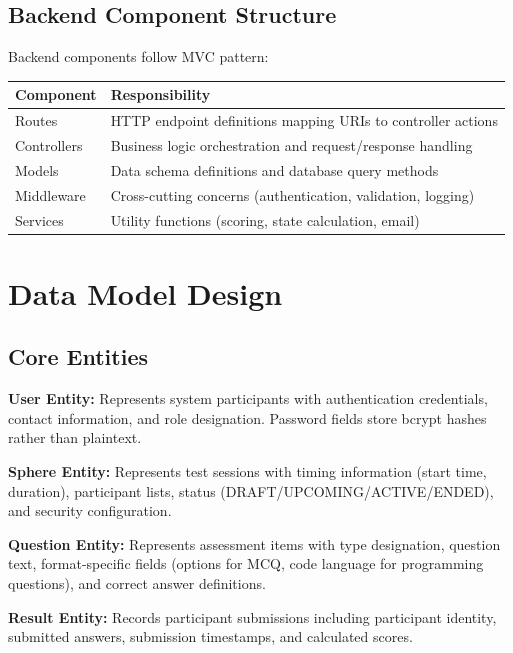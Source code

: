 \documentclass[12pt,a4paper]{report}
\newenvironment{reqbox}{%
  \begin{tcolorbox}[colback=lightgray,colframe=rulecol,
    leftrule=3pt,rightrule=0.4pt,toprule=0.4pt,bottomrule=0.4pt,
    arc=2pt,boxsep=2pt,left=4pt,right=4pt,top=3pt,bottom=3pt,breakable]
}{\end{tcolorbox}}
\newcommand{\rA}{\rowcolor{white}}
\newcommand{\rB}{\rowcolor{lightgray}}
\newcommand{\rH}{\rowcolor{headcol}}
\begin{document}
\subsection{Backend Component Structure}

Backend components follow MVC pattern:

\begin{reqbox}
  \begin{tabular}{|l|p{8cm}|}
    \hline
    \rH \textbf{Component} & \textbf{Responsibility} \\
    \hline
    \rA Routes & HTTP endpoint definitions mapping URIs to controller actions \\
    \hline
    \rB Controllers & Business logic orchestration and request/response handling \\
    \hline
    \rA Models & Data schema definitions and database query methods \\
    \hline
    \rB Middleware & Cross-cutting concerns (authentication, validation, logging) \\
    \hline
    \rA Services & Utility functions (scoring, state calculation, email) \\
    \hline
  \end{tabular}
\end{reqbox}

\section{Data Model Design}

\subsection{Core Entities}

\textbf{User Entity:} Represents system participants with authentication credentials, contact information, and role designation. Password fields store bcrypt hashes rather than plaintext.

\textbf{Sphere Entity:} Represents test sessions with timing information (start time, duration), participant lists, status (DRAFT/UPCOMING/ACTIVE/ENDED), and security configuration.

\textbf{Question Entity:} Represents assessment items with type designation, question text, format-specific fields (options for MCQ, code language for programming questions), and correct answer definitions.

\textbf{Result Entity:} Records participant submissions including participant identity, submitted answers, submission timestamps, and calculated scores.
\end{document}
